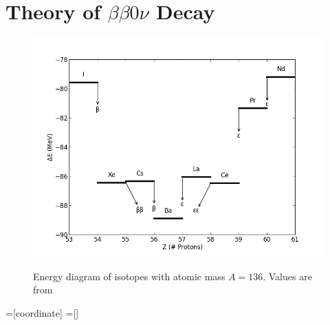 \renewcommand{\thechapter}{1}
\chapter{Theory of \texorpdfstring{$\beta\beta 0\nu$}{Neutrinoless Double-Beta} Decay}


\begin{figure}
\begin{center}
\includegraphics[keepaspectratio=true,width=\textwidth]{scripts/LevelDiagram.png}
\end{center}
\renewcommand{\baselinestretch}{1}
\small\normalsize
\begin{quote}
\caption{Energy diagram of isotopes with atomic mass $A=136$.  Values are from~\cite{AtomicMassEvaluation}}
\label{fig:LevelDiagram}
\end{quote}
\end{figure}
\renewcommand{\baselinestretch}{2}
\small\normalsize

=[coordinate]
=[]

